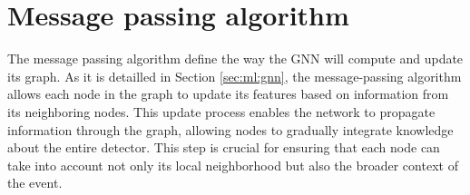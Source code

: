 \documentclass[../main.tex]{subfiles}
\begin{document}
\section{Message passing algorithm}
\label{sec:jgnn:mpa}
The message passing algorithm define the way the GNN will compute and update its graph. As it is detailled in Section \ref{sec:ml:gnn}, the message-passing algorithm allows each node in the graph to update its features based on information from its neighboring nodes. This update process enables the network to propagate information through the graph, allowing nodes to gradually integrate knowledge about the entire detector. This step is crucial for ensuring that each node can take into account not only its local neighborhood but also the broader context of the event.
\end{document}
